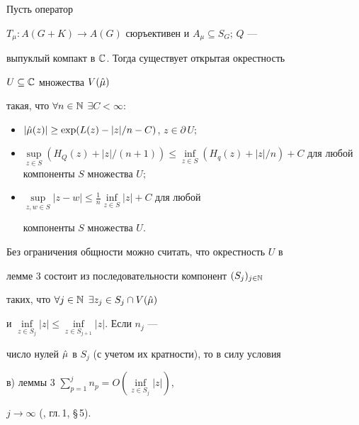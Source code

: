 \begin{lem}


Пусть оператор 


$T_\mu :A(G+K)\to A(G)$ сюръективен и $A_\mu\subseteq S_G$; $Q$ --- 


выпуклый компакт в $\Bbb C$. Тогда существует открытая окрестность 


$U\subseteq \Bbb C$ множества $V(\Hat\mu)$ 


такая, что $\forall n\in\Bbb N$ $\exists C<\infty:$ 


\begin{itemize} 


\item[а)] $|\Hat\mu(z)|\ge \exp(L(z)-|z|/n-C)$, $z\in\partial\, U;$ 


\item[б)] $\sup\limits_{z\in S}(H_Q(z)+|z|/(n+1))\le 


\inf\limits_{z\in S}(H_q(z)+|z|/n)+C$ для любой компоненты $S$ множества $U;$ 


\item[в)] $\sup\limits_{z,w\in S}|z-w|\le\frac{1}{n} 


\inf\limits_{z\in S}|z|+C$ для любой 


компоненты $S$ множества $U$. 


\end{itemize} 


\end{lem} 


 


\begin{note} Без ограничения общности можно считать, что окрестность $U$ в 


лемме 3 состоит из последовательности компонент $(S_j)_{j\in\Bbb N}$ 


таких, что $\forall j\in\Bbb N$ $\exists z_j\in S_j\cap V(\Hat\mu)$ 


и $\inf\limits_{z\in S_j}|z|\le\inf\limits_{z\in S_{j+1}}|z|$. Если $n_j$ --- 


число нулей $\Hat\mu$ в $S_j$ (с учетом их кратности), то в силу условия 


в) леммы 3 $\sum\limits_{p=1}^j n_p=O(\inf\limits_{z\in S_j}|z|)$, 


$j\to\infty$ (\cite{Lev}, гл.\,1, \S\,5). 


\end{note} 


